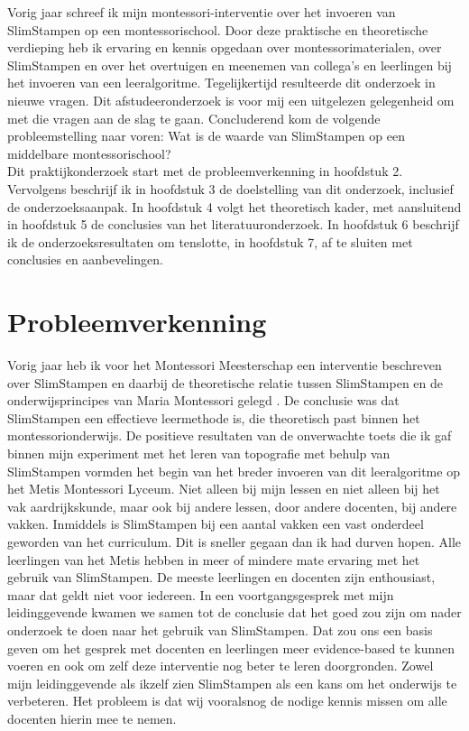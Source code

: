 \documentclass[12pt, a4paper]{article}
\begin{document}
Vorig jaar schreef ik mijn montessori-interventie over het invoeren van SlimStampen op een montessorischool. \cite[]{Marijn23} Door deze praktische en theoretische verdieping heb ik ervaring en kennis opgedaan over montessorimaterialen, over SlimStampen en over het overtuigen en meenemen van collega's en leerlingen bij het invoeren van een leeralgoritme. Tegelijkertijd resulteerde dit onderzoek in nieuwe vragen. Dit afstudeeronderzoek is voor mij een uitgelezen gelegenheid om met die vragen aan de slag te gaan. Concluderend kom de volgende probleemstelling naar voren: Wat is de waarde van SlimStampen op een middelbare montessorischool?\\

Dit praktijkonderzoek start met de probleemverkenning in hoofdstuk 2. Vervolgens beschrijf ik in hoofdstuk 3 de doelstelling van dit onderzoek, inclusief de onderzoeksaanpak. In hoofdstuk 4 volgt het theoretisch kader, met aansluitend in hoofdstuk 5 de conclusies van het literatuuronderzoek. In hoofdstuk 6 beschrijf ik de onderzoeksresultaten om tenslotte, in hoofdstuk 7, af te sluiten met conclusies en aanbevelingen.
\newpage
\section{Probleemverkenning}
Vorig jaar heb ik voor het Montessori Meesterschap een interventie beschreven over SlimStampen en daarbij de theoretische relatie tussen SlimStampen en de onderwijsprincipes van Maria Montessori gelegd \cite[]{Marijn23}. De conclusie was dat SlimStampen een effectieve leermethode is, die theoretisch past binnen het montessorionderwijs.
De positieve resultaten van de onverwachte toets die ik gaf binnen mijn experiment met het leren van topografie met behulp van SlimStampen vormden het begin van het breder invoeren van dit leeralgoritme op het Metis Montessori Lyceum. Niet alleen bij mijn lessen en niet alleen bij het vak aardrijkskunde, maar ook bij andere lessen, door andere docenten, bij andere vakken. 
Inmiddels is SlimStampen bij een aantal vakken een vast onderdeel geworden van het curriculum. Dit is sneller gegaan dan ik had durven hopen. Alle leerlingen van het Metis hebben in meer of mindere mate ervaring met het gebruik van SlimStampen. De meeste leerlingen en docenten zijn enthousiast, maar dat geldt niet voor iedereen. In een voortgangsgesprek met mijn leidinggevende kwamen we samen tot de conclusie dat het goed zou zijn om nader onderzoek te doen naar het gebruik van SlimStampen. Dat zou ons een basis geven om het gesprek met docenten en leerlingen meer evidence-based te kunnen voeren en ook om zelf deze interventie nog beter te leren doorgronden. Zowel mijn leidinggevende als ikzelf zien SlimStampen als een kans om het onderwijs te verbeteren. Het probleem is dat wij vooralsnog de nodige kennis missen om alle docenten hierin mee te nemen.
\end{document}
